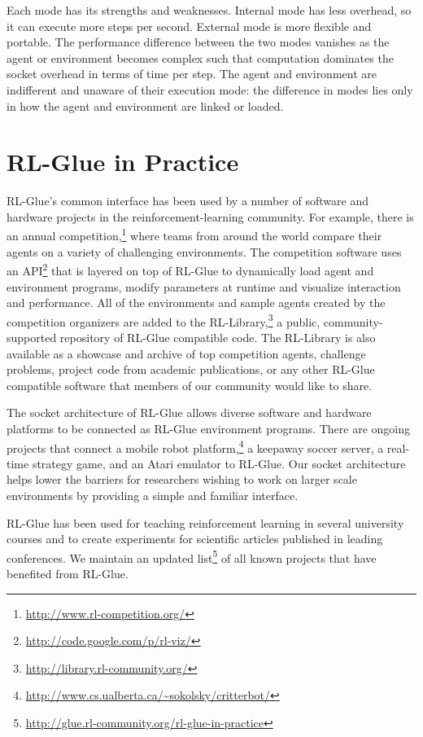 \documentclass[twoside,11pt]{article}
\begin{document}
Each mode has its strengths and weaknesses. Internal mode has less overhead, so it can execute more steps per second. External mode is more flexible and portable.  The performance difference between the two modes vanishes as the agent or environment becomes complex such that computation dominates the socket overhead in terms of time per step.  The agent and environment are indifferent and unaware of their execution mode: the difference in modes lies only in how the agent and environment are linked or loaded.

\section{RL-Glue in Practice}
\vspace{-0.2cm}
RL-Glue's common interface has been used by a number of software and hardware projects in the reinforcement-learning community.  For example, there is an annual competition,\footnote{\url{http://www.rl-competition.org/}} where teams from around the world compare their agents on a variety of challenging environments.  The competition software uses an API\footnote{\url{http://code.google.com/p/rl-viz/}} that is layered on top of RL-Glue to dynamically load agent and environment programs, modify parameters at runtime and visualize interaction and performance.  All of the environments and sample agents created by the competition organizers are added to the RL-Library,\footnote{\url{http://library.rl-community.org/}} a public, community-supported repository of RL-Glue compatible code. The RL-Library is also available as a showcase and archive of top competition agents, challenge problems, project code from academic publications, or any other RL-Glue compatible software that members of our community would like to share.


The socket architecture of RL-Glue allows diverse software and hardware platforms to be connected as RL-Glue environment programs.  There are ongoing projects that connect a mobile robot platform,\footnote{\url{http://www.cs.ualberta.ca/~sokolsky/critterbot/}} a  keepaway soccer server, a real-time strategy game, and an Atari emulator to RL-Glue. Our socket architecture helps lower the barriers for researchers wishing to work on larger scale environments by providing a simple and familiar interface. %

RL-Glue has been used for teaching reinforcement learning in several university courses and to create experiments for scientific articles published in leading conferences. We maintain an updated list\footnote{\url{http://glue.rl-community.org/rl-glue-in-practice}} of all known projects that have benefited from RL-Glue.
\end{document}
